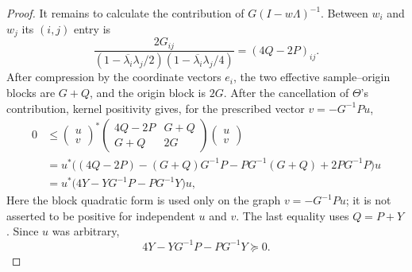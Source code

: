 \documentclass[preprints,article,submit,oneauthor]{Definitions/mdpi}
\theoremstyle{mdpi}
\theoremstyle{definition}
\begin{document}
\begin{proof}
It remains to calculate the contribution of
$G(I-w\Lambda)^{-1}$.  Between $w_i$ and $w_j$ its $(i,j)$ entry is
\begin{equation}
  \frac{2G_{ij}}
  {(1-\overline{\lambda_i}\lambda_j/2)
   (1-\overline{\lambda_i}\lambda_j/4)}
  =(4Q-2P)_{ij}.
  \label{eq:sampled-main-block}
\end{equation}
After compression by the coordinate vectors $e_i$, the two effective
sample--origin blocks are $G+Q$, and the origin block is $2G$.  After
the cancellation of $\Theta$'s contribution, kernel positivity gives,
for the prescribed vector $v=-G^{-1}Pu$,
\begin{equation}
\begin{aligned}
0&\leq
\begin{pmatrix}u\\v\end{pmatrix}^{\!*}
\begin{pmatrix}
  4Q-2P&G+Q\\
  G+Q&2G
\end{pmatrix}
\begin{pmatrix}u\\v\end{pmatrix}\\
&=u^*\bigl((4Q-2P)-(G+Q)G^{-1}P
-PG^{-1}(G+Q)+2PG^{-1}P\bigr)u\\
&=u^*\bigl(4Y-YG^{-1}P-PG^{-1}Y\bigr)u,
\end{aligned}
\label{eq:pre-gramian-inequality}
\end{equation}
Here the block quadratic form is used only on the graph
$v=-G^{-1}Pu$; it is not asserted to be positive for independent
$u$ and $v$.  The last equality uses $Q=P+Y$.
Since $u$ was arbitrary,
\begin{equation}
  4Y-YG^{-1}P-PG^{-1}Y\succeq0.
  \label{eq:Y-inequality}
\end{equation}


\end{proof}
\end{document}
